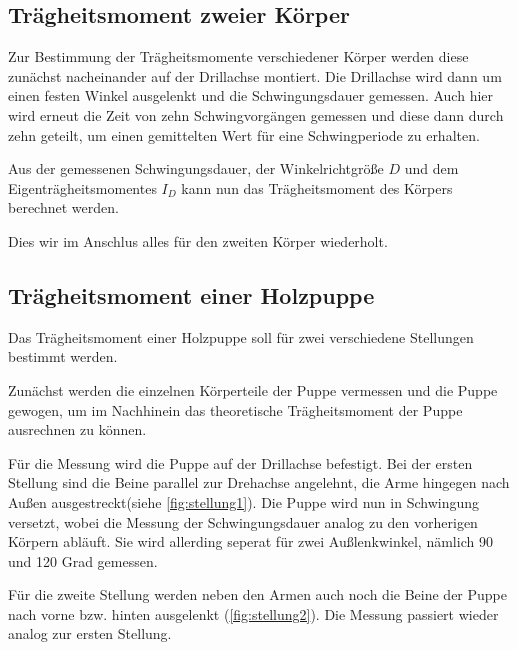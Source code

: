 \subsection{Trägheitsmoment zweier Körper}
Zur Bestimmung der Trägheitsmomente verschiedener Körper werden diese zunächst nacheinander auf der Drillachse montiert. Die Drillachse wird dann um einen festen Winkel ausgelenkt und die
Schwingungsdauer gemessen. Auch hier wird erneut die Zeit von zehn Schwingvorgängen gemessen und diese dann durch zehn geteilt, um einen gemittelten Wert für eine Schwingperiode zu erhalten.

Aus der gemessenen Schwingungsdauer, der Winkelrichtgröße $D$ und dem Eigenträgheitsmomentes $ I_D $ kann nun das Trägheitsmoment des Körpers berechnet werden.

Dies wir im Anschlus alles für den zweiten Körper wiederholt.

\subsection{Trägheitsmoment einer Holzpuppe}
Das Trägheitsmoment einer Holzpuppe soll für zwei verschiedene Stellungen bestimmt werden. 

Zunächst werden die einzelnen Körperteile der Puppe vermessen und die Puppe gewogen, um im Nachhinein das theoretische Trägheitsmoment der Puppe ausrechnen zu können.

Für die Messung wird die Puppe auf der Drillachse befestigt. Bei der ersten Stellung sind die Beine parallel zur Drehachse angelehnt, die Arme hingegen nach Außen ausgestreckt(siehe \autoref{fig:stellung1}).
Die Puppe wird nun in Schwingung versetzt, wobei die Messung der Schwingungsdauer analog zu den vorherigen Körpern abläuft. Sie wird allerding seperat für zwei Außlenkwinkel, nämlich 90 und 120 Grad
gemessen.

Für die zweite Stellung werden neben den Armen auch noch die Beine der Puppe nach vorne bzw. hinten ausgelenkt (\autoref{fig:stellung2}). Die Messung passiert wieder analog zur ersten Stellung.